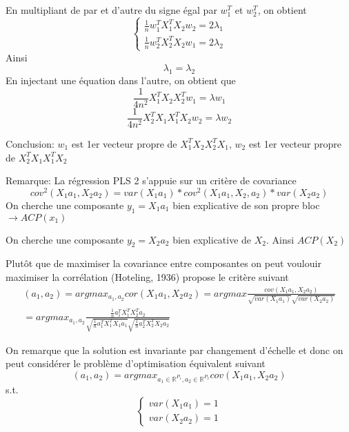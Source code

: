 \documentclass{article}
\begin{document}
En multipliant de par et d'autre du signe \'egal par $w_1^T$ et $w_2^T$, on obtient
\begin{equation}
\left\{\begin{array}{ll}
\frac{1}{n}w_1^TX_1^TX_2w_2=2\lambda_1\\
\frac{1}{n}w_2^TX_2^TX_2w_1=2\lambda_2
\end{array}\right.
\end{equation}
Ainsi
\begin{equation}
\lambda_1=\lambda_2
\end{equation}
En injectant une \'equation dans l'autre, on obtient que 
\begin{equation}
\frac{1}{4n^2}X_1^TX_2X_2^Tw_1=\lambda w_1
\end{equation}
\begin{equation}
\frac{1}{4n^2}X_2^TX_1X_1^TX_2w_2=\lambda w_2
\end{equation}

Conclusion:
$w_1$ est 1er vecteur propre de $X_1^TX_2X_2^TX_1$, $w_2$ est 1er vecteur propre de $X_2^TX_1X_1^TX_2$

Remarque: La r\'egression PLS 2 s'appuie sur un crit\`ere de covariance
\begin{equation}
cov^2(X_1a_1, X_2a_2)=var(X_1a_1)*cov^2(X_1a_1,X_2,a_2)*var(X_2a_2)
\end{equation}
On cherche une composante $y_1=X_1a_1$ bien explicative de son propre bloc $\to ACP(x_1)$

On cherche une composante $y_2=X_2a_2$ bien explicative de $X_2$. Ainsi $ACP(X_2)$

Plut\^ot que de maximiser la covariance entre composantes on peut voulouir maximiser la corr\'elation (Hoteling, 1936) propose le crit\`ere suivant
\begin{equation}
\begin{split}
(a_1, a_2)=argmax_{a_1,a_2} cor(X_1a_1,X_2a_2)=argmax\frac{cov(X_1a_1,X_2a_2)}{\sqrt{var(X_1a_1)}\sqrt{var(X_2a_2)}}\\
=argmax_{a_1,a_2} \frac{\frac{1}{n}a_1^TX_1^TX_2^Ta_2}{\sqrt{\frac{1}{n}a_1^TX_1^TX_1a_1}\sqrt{\frac{1}{n}a_2^TX_2^TX_2a_2}}
\end{split}
\end{equation}

On remarque que la solution est invariante par changement d'\'echelle et donc on peut consid\'erer le probl\`eme d'optimisation \'equivalent suivant
\begin{equation}
(a_1,a_2)=argmax_{a_1\in\mathbb{R}^{P_1},a_2\in\mathbb{R}^{P_2}} cov(X_1a_1,X_2a_2)
\end{equation}   
s.t.
\begin{equation}
\left\{\begin{array}{ll}
var(X_1a_1)=1\\
var(X_2a_2)=1
\end{array}\right.
\end{equation}
\end{document}
